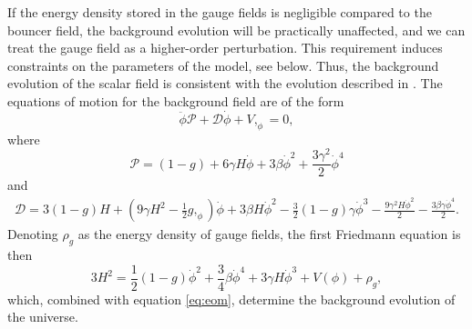 \documentclass[12pt,a4paper]{article}
\numberwithin{equation}{section}
\numberwithin{equation}{section}
\begin{document}
If the energy density stored in the gauge fields is negligible compared to the bouncer field, the background evolution will be practically unaffected, and we can treat the gauge field as a higher-order perturbation. This requirement induces constraints on the parameters of the model, see below. %
Thus, the background evolution of the scalar field is consistent with the evolution described in  \cite{Cai:2012va}.
The equations of motion for the background field are of the form 
\begin{equation}
    \ddot{\phi} \mathcal{P} + \mathcal{D} \dot{\phi} + V,_{\phi} = 0,
    \label{eq:eom}
\end{equation}
where
\begin{equation}
  \mathcal{P} = (1-g) + 6 \gamma H \dot{\phi} + 3 \beta \dot{\phi}^2 + \frac{3 \gamma^2}{2} \dot{\phi}^4
  \label{eq:p}
\end{equation}
and
\begin{equation}
\begin{split}
    \mathcal{D}  = 3 (1-g) H +(9 \gamma H^2-\frac{1}{2} g,_{\phi}) \dot{\phi} + 3 \beta H \dot{\phi}^2 -\frac{3}{2} (1-g) \gamma \dot{\phi}^3 -\frac{9 \gamma^2 H \dot{\phi}^2}{2} -\frac{3 \beta \gamma \dot{\phi}^4 }{2}. 
    \end{split}
    \label{eq:d}
\end{equation}
Denoting $\rho_g$ as the energy density of gauge fields, the first Friedmann equation is then %
\begin{equation}
    3H^2 = \frac{1}{2} (1-g) \dot{\phi}^2+ \frac{3}{4} \beta \dot{\phi}^4+ 3 \gamma H \dot{\phi}^3+V(\phi)+\rho_g,
\end{equation}
which, combined with equation \eqref{eq:eom}, determine the background evolution of the universe.
\end{document}
